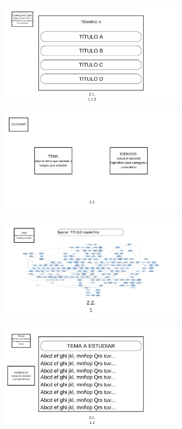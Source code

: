 \documentclass{report}
\begin{document}
\begin{figure}[H]
    \centering
    \includegraphics[width=0.8\textwidth]{./Diagramas/14.png}
\end{figure}

\begin{figure}[H]
    \centering
    \includegraphics[width=0.8\textwidth]{./Diagramas/15.png}
\end{figure}

\begin{figure}[H]
    \centering
    \includegraphics[width=0.8\textwidth]{./Diagramas/16.png}
\end{figure}

\begin{figure}[H]
    \centering
    \includegraphics[width=0.8\textwidth]{./Diagramas/17.png}
\end{figure}
\end{document}
